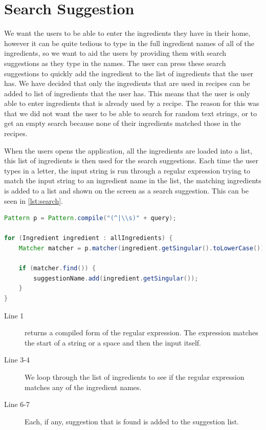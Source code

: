 \section{Search Suggestion}
We want the users to be able to enter the ingredients they have in their home, however it can be quite tedious to type in the full ingredient names of all of the ingredients, so we want to aid the users by providing them with search suggestions as they type in the names. The user can press these search suggestions to quickly add the ingredient to the list of ingredients that the user has. 
We have decided that only the ingredients that are used in recipes can be added to list of ingredients that the user has. This means that the user is only able to enter ingredients that is already used by a recipe. The reason for this was that we did not want the user to be able to search for random text strings, or to get an empty search because none of their ingredients matched those in the recipes. 

When the users opens the application, all the ingredients are loaded into a list, this list of ingredients is then used for the search suggestions. Each time the user types in a letter, the input string is run through a regular expression trying to match the input string to an ingredient name in the list, the matching ingredients is added to a list and shown on the screen as a search suggestion. This can be seen in \autoref{lst:search}.
\pagebreak

\begin{lstlisting}[language=java, label=lst:search, caption={Search suggestions.}]
Pattern p = Pattern.compile("(^|\\s)" + query);

for (Ingredient ingredient : allIngredients) {
    Matcher matcher = p.matcher(ingredient.getSingular().toLowerCase());

    if (matcher.find()) {
        suggestionName.add(ingredient.getSingular());
    }
}
\end{lstlisting}

\begin{description}
\item[Line 1]  returns a compiled form of the regular expression. The expression matches the start of a string or a space and then the input itself. 
\item[Line 3-4] We loop through the list of ingredients to see if the regular expression matches any of the ingredient names.
\item[Line 6-7] Each, if any, suggestion that is found is added to the suggestion list.
\end{description}

